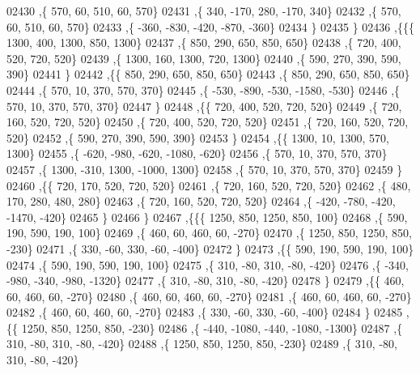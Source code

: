 \begin{DoxyCode}
02430     ,\{   570,    60,   510,    60,   570\}
02431     ,\{   340,  -170,   280,  -170,   340\}
02432     ,\{   570,    60,   510,    60,   570\}
02433     ,\{  -360,  -830,  -420,  -870,  -360\}
02434     \}
02435    \}
02436   ,\{\{\{  1300,   400,  1300,   850,  1300\}
02437     ,\{   850,   290,   650,   850,   650\}
02438     ,\{   720,   400,   520,   720,   520\}
02439     ,\{  1300,   160,  1300,   720,  1300\}
02440     ,\{   590,   270,   390,   590,   390\}
02441     \}
02442    ,\{\{   850,   290,   650,   850,   650\}
02443     ,\{   850,   290,   650,   850,   650\}
02444     ,\{   570,    10,   370,   570,   370\}
02445     ,\{  -530,  -890,  -530, -1580,  -530\}
02446     ,\{   570,    10,   370,   570,   370\}
02447     \}
02448    ,\{\{   720,   400,   520,   720,   520\}
02449     ,\{   720,   160,   520,   720,   520\}
02450     ,\{   720,   400,   520,   720,   520\}
02451     ,\{   720,   160,   520,   720,   520\}
02452     ,\{   590,   270,   390,   590,   390\}
02453     \}
02454    ,\{\{  1300,    10,  1300,   570,  1300\}
02455     ,\{  -620,  -980,  -620, -1080,  -620\}
02456     ,\{   570,    10,   370,   570,   370\}
02457     ,\{  1300,  -310,  1300, -1000,  1300\}
02458     ,\{   570,    10,   370,   570,   370\}
02459     \}
02460    ,\{\{   720,   170,   520,   720,   520\}
02461     ,\{   720,   160,   520,   720,   520\}
02462     ,\{   480,   170,   280,   480,   280\}
02463     ,\{   720,   160,   520,   720,   520\}
02464     ,\{  -420,  -780,  -420, -1470,  -420\}
02465     \}
02466    \}
02467   ,\{\{\{  1250,   850,  1250,   850,   100\}
02468     ,\{   590,   190,   590,   190,   100\}
02469     ,\{   460,    60,   460,    60,  -270\}
02470     ,\{  1250,   850,  1250,   850,  -230\}
02471     ,\{   330,   -60,   330,   -60,  -400\}
02472     \}
02473    ,\{\{   590,   190,   590,   190,   100\}
02474     ,\{   590,   190,   590,   190,   100\}
02475     ,\{   310,   -80,   310,   -80,  -420\}
02476     ,\{  -340,  -980,  -340,  -980, -1320\}
02477     ,\{   310,   -80,   310,   -80,  -420\}
02478     \}
02479    ,\{\{   460,    60,   460,    60,  -270\}
02480     ,\{   460,    60,   460,    60,  -270\}
02481     ,\{   460,    60,   460,    60,  -270\}
02482     ,\{   460,    60,   460,    60,  -270\}
02483     ,\{   330,   -60,   330,   -60,  -400\}
02484     \}
02485    ,\{\{  1250,   850,  1250,   850,  -230\}
02486     ,\{  -440, -1080,  -440, -1080, -1300\}
02487     ,\{   310,   -80,   310,   -80,  -420\}
02488     ,\{  1250,   850,  1250,   850,  -230\}
02489     ,\{   310,   -80,   310,   -80,  -420\}

\end{DoxyCode}
